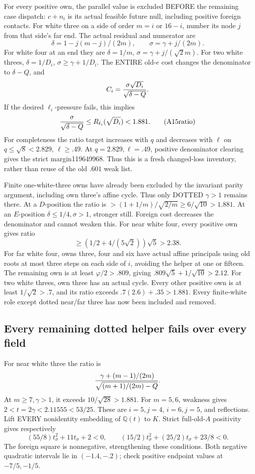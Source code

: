 For every positive own, the parallel value is excluded BEFORE
the remaining case dispatch: \(c+n_i\) is its actual feasible
future null, including positive foreign contacts.
For white three on a side of order \(m=i\) or \(16-i\),
number its node \(j\) from that side's far end.
The actual residual and numerator are
\[
 \delta=1-j(m-j)/(2m),\qquad \sigma=\gamma+j/(2m).
\]
For white four at an end they are
\(\delta=1/m\), \(\sigma=\gamma+j/(\sqrt2m)\).
For two white threes, \(\delta=1/D_i\),
\(\sigma\ge\gamma+1/D_i\).
The ENTIRE old-\(e\) cost changes the denominator to
\(\delta-Q\), and
\[
                   C_i={\sigma\sqrt{D_i}\over\sqrt{\delta-Q}} .
\]
If the desired \(\ell_i\)-pressure fails, this implies
\[
 {\sigma\over\sqrt{\delta-Q}}
       \le R_{\ell_i}(\sqrt{D_i})<1.881 .
\tag{A15ratio}\label{eq:arithA15ratio}
\]
For completeness the ratio target increases with \(q\) and
decreases with \(\ell\) on \(q\le\sqrt8<2.829\),
\(\ell\ge.49\).
At \(q=2.829,\ell=.49\), positive denominator clearing gives
the strict margin119649968.
Thus this is a fresh changed-loss inventory, rather than
reuse of the old \(.601\) weak list.

Finite one-white-three owns have already been excluded by
the invariant parity argument, including own three's affine cycle.
Thus only DOTTED \(\gamma>1\) remains there.
At a \(D\)-position the ratio is
\(>(1+1/m)/\sqrt{2/m}\ge6/\sqrt{10}>1.881\).
At an \(E\)-position \(\delta\le1/4,\sigma>1\), stronger still.
Foreign cost decreases the denominator and cannot weaken this.
For near white four, every positive own gives ratio
\[
            \ge(1/2+4/(5\sqrt2))\sqrt5>2.38 .
\]
For far white four, owns three, four and six have actual
affine principals using old roots at most three steps on each
side of \(i\), avoiding the helper at one or fifteen.
The remaining own is at least \(\varphi/2>.809\), giving
\(.809\sqrt5+1/\sqrt{10}>2.12\).
For two white threes, own three has an actual cycle.
Every other positive own is at least \(1/\sqrt2>.7\),
and its ratio exceeds \(.7(2.6)+.35>1.881\).
Every finite-white role except dotted near/far three has now
been included and removed.

\subsection{Every remaining dotted helper fails over every field}
\label{app:arithA15dottedhelpers}

For near white three the ratio is
\[
 {\,\gamma+(m-1)/(2m)\over\sqrt{(m+1)/(2m)-Q}}.
\]
At \(m\ge7,\gamma>1\), it exceeds \(10/\sqrt{28}>1.881\).
For \(m=5,6\), weakness gives
\(2<t=2\gamma<2.11555<53/25\).
These are \(i=5,j=4\), \(i=6,j=5\), and reflections.
Lift EVERY nonidentity embedding of \(\mathbb Q(t)\) to \(K\).
Strict full-old-\(A\) positivity gives respectively
\[
 (55/8)t_\sigma^2+11t_\sigma+2<0,\qquad
 (15/2)t_\sigma^2+(25/2)t_\sigma+23/8<0 .
\]
The foreign square is nonnegative, strengthening these conditions.
Both negative quadratic intervals lie in \((-1.4,-.2)\);
check positive endpoint values at \(-7/5,-1/5\).

